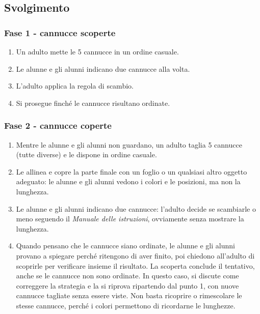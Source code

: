\subsection{Svolgimento }\label{svolgimento}

\subsubsection{Fase 1 - cannucce scoperte}\label{fase-1---cannucce-scoperte}

\begin{enumerate}
\def\labelenumi{\arabic{enumi}.}
\item
  Un adulto mette le 5 cannucce in un ordine casuale.
\item
  Le alunne e gli alunni indicano due cannucce alla volta.
\item
  L'adulto applica la regola di scambio.
\item
  Si prosegue finché le cannucce risultano ordinate.
\end{enumerate}

\subsubsection{Fase 2 - cannucce coperte}\label{fase-2---cannucce-coperte}

\begin{enumerate}
\def\labelenumi{\arabic{enumi}.}
\item
  Mentre le alunne e gli alunni non guardano, un adulto taglia 5 cannucce (tutte diverse) e le dispone in ordine casuale.
\item
  Le allinea e copre la parte finale con un foglio o un qualsiasi altro oggetto adeguato: le alunne e gli alunni vedono i colori e le posizioni, ma non la lunghezza.
\item
  Le alunne e gli alunni indicano due cannucce: l'adulto decide se scambiarle o meno seguendo il \emph{Manuale delle istruzioni}, ovviamente senza mostrare la lunghezza.
\item
  Quando pensano che le cannucce siano ordinate, le alunne e gli alunni provano a spiegare perché ritengono di aver finito, poi chiedono all'adulto di scoprirle per verificare insieme il risultato. La scoperta conclude il tentativo, anche se le cannucce non sono ordinate. In questo caso, si discute come correggere la strategia e la si riprova ripartendo dal punto 1, con nuove cannucce tagliate senza essere viste. Non basta ricoprire o rimescolare le stesse cannucce, perché i colori permettono di ricordarne le lunghezze.
\end{enumerate}

